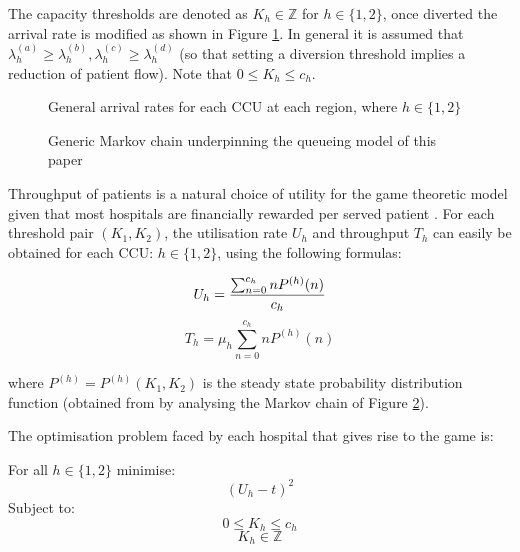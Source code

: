\documentclass[a4paper,11pt]{article}
\begin{document}
The capacity thresholds are denoted as $K_{h}\in\mathbb{Z}$ for $h\in\{1,2\}$, once diverted the arrival rate is modified as shown in Figure \ref{arrivalrateregions}.
In general it is assumed that $\lambda_h^{(a)}\geq \lambda_{h}^{(b)}, \lambda_{h}^{(c)}\geq \lambda_{h}^{(d)}$ (so that setting a diversion threshold implies a reduction of patient flow).
Note that $0\leq K_h\leq c_h$.

\begin{figure}[!htbp]
\begin{center}
\caption{General arrival rates for each CCU at each region, where $h\in\{1, 2\}$} \label{arrivalrateregions}
\end{center}
\end{figure}

\begin{figure}[!htbp]
\begin{center}

\caption{Generic Markov chain underpinning the queueing model of this paper} \label{mc}
\end{center}
\end{figure}

Throughput of patients is a natural choice of utility for the game theoretic model given that most hospitals are financially rewarded per served patient \cite{Pate2009}.
For each threshold pair $(K_{1},K_{2})$, the utilisation rate $U_h$ and throughput $T_h$ can easily be obtained for each CCU: $h\in\{\text{1},\text{2}\}$, using the following formulas:

$$U_{h}={{\sum_{n=0}^{c_h} nP^{(h)}(n)}\over{c_{h}}}$$
$$T_{h}=\mu_h \sum _{n=0}^{c_h} nP^{(h)}(n)$$

where $P^{(h)}=P^{(h)}(K_{1},K_{2})$ is the steady state probability distribution function (obtained from by analysing the Markov chain of Figure \ref{mc}).

The optimisation problem faced by each hospital that gives rise to the game is:

For all $h\in\{\text{1}, \text{2}\}$ minimise:
\begin{equation}\left(U_{h}-t\right)^2\end{equation}
Subject to:
\begin{equation}
0\leq K_h \leq c_{h}
\end{equation}
\begin{equation}
K_h \in  \mathbb{Z}
\end{equation}
\end{document}
